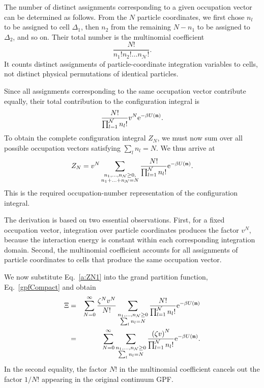 \documentclass[12pt]{article}
\begin{document}
	The number of distinct assignments corresponding to a given occupation vector can be determined as follows. From the $N$ particle coordinates, we first chose $n_l$ to be assigned to cell $\Delta_1$, then $n_2$ from the remaining $N-n_1$ to be assigned to $\Delta_2$, and so on. Their total number is the multinomial coefficient
	\begin{equation}
		\label{multinom}
		\frac{N!}{n_1! n_2! \ldots n_{\mathcal{N}}!}.
	\end{equation}
	It counts distinct assignments of particle-coordinate integration variables to cells, not distinct physical permutations of identical particles.
	
	Since all assignments corresponding to the same occupation vector contribute equally, their total contribution to the configuration integral is
	\begin{equation}
		\frac{N!}{\prod_{l=1}^{\mathcal{N}} n_l!} v^N {\rm e}^{-\beta U(\mathbf{n})}.
	\end{equation}
	To obtain the complete configuration integral $Z_N$, we must now sum over all possible occupation vectors satisfying $\sum_l n_l = N$. We thus arrive at
	\begin{equation}
		\label{a:ZN1}
		Z_N = v^N \sum_{\substack{n_1, \ldots, n_{\mathcal{N}} \geq 0, \\ n_1 + \ldots + n_{\mathcal{N}} = N}} \frac{N!}{\prod_{l=1}^{\mathcal{N}} n_l!} {\rm e}^{-\beta U(\mathbf{n})}.
	\end{equation}
	This is the required occupation-number representation of the configuration integral.
	
	The derivation is based on two essential observations. First, for a fixed occupation vector, integration over particle coordinates produces the factor $v^N$, because the interaction energy is constant within each corresponding integration domain. Second, the multinomial coefficient accounts for all assignments of particle coordinates to cells that produce the same occupation vector.
	
	We now substitute Eq.~\eqref{a:ZN1} into the grand partition function, Eq.~\eqref{gpfCompact} and obtain
	\begin{eqnarray}
		\Xi & = & \sum_{N=0}^{\infty} \frac{\zeta^N v^N}{N!} \sum_{\substack{n_1, \ldots, n_{\mathcal{N}} \geq 0 \\ \sum_l n_l = N}} \frac{N!}{\prod_{l=1}^{\mathcal{N}} n_l!}  {\rm e}^{-\beta U(\mathbf{n})}
		\nonumber \\
		& = & \sum_{N=0}^{\infty} \sum_{\substack{n_1, \ldots, n_{\mathcal{N}} \geq 0 \\ \sum_l n_l = N}}
		\frac{\left(\zeta v\right)^N}{\prod_{l=1}^{\mathcal{N}} n_l!} {\rm e}^{-\beta U(\mathbf{n})}.
	\end{eqnarray}
	In the second equality, the factor $N!$ in the multinomial coefficient cancels out the factor $1/N!$ appearing in the original continuum GPF.
	
\end{document}
